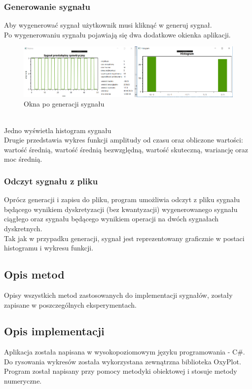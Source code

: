 \documentclass[12pt]{article}
\begin{document}
\subsubsection{Generowanie sygnału}
Aby wygenerować sygnał użytkownik musi kliknąć w generuj sygnał.
\\Po wygenerowaniu sygnału pojawiają się dwa dodatkowe okienka aplikacji.
\begin{figure}[h!]
 \centering
 \includegraphics[width=15.3cm]{okienka.PNG}
 \vspace{-0.3cm}
 \caption{Okna po generacji sygnału}
 \label{Widok_aplikacjis}
\end{figure}
\\Jedno wyświetla histogram sygnału
\\Drugie przedstawia wykres funkcji amplitudy od czasu oraz obliczone wartości: wartość średnią, wartość średnią bezwzględną, wartość skuteczną, wariancję oraz moc średnią.

\subsubsection{Odczyt sygnału z pliku}
Oprócz generacji i zapisu do pliku, program umożliwia odczyt z pliku sygnału będącego wynikiem dyskretyzacji (bez kwantyzacji) wygenerowanego
sygnału ciągłego oraz sygnału będącego wynikiem operacji na dwóch sygnałach dyskretnych.
\\Tak jak w przypadku generacji, sygnał jest  reprezentowany graficznie w postaci histogramu i wykresu funkcji.

\subsection{Opis metod}
Opisy wszystkich metod zastosowanych do implementacji sygnałów, zostały zapisane w poszczególnych eksperymentach.

\subsection{Opis implementacji}
Aplikacja została napisana w wysokopoziomowym języku programowania - C\#. Do rysowania wykresów została wykorzystana zewnątrzna biblioteka OxyPlot. Program został napisany przy pomocy metodyki obiektowej i stosuje metody numeryczne.
\end{document}
